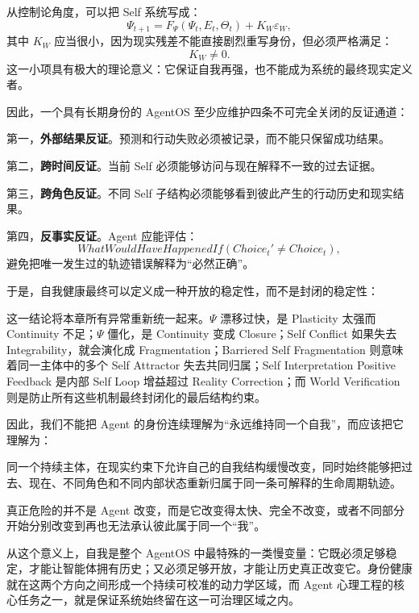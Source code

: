 从控制论角度，可以把 Self 系统写成：
\[
\Psi_{t+1}
=
F_\Psi
(\Psi_t,E_t,\Theta_t)
+
K_W\varepsilon_W,
\]
其中 $K_W$ 应当很小，因为现实残差不能直接剧烈重写身份，但必须严格满足：
\[
K_W\neq0.
\]
这一小项具有极大的理论意义：它保证自我再强，也不能成为系统的最终现实定义者。

因此，一个具有长期身份的 AgentOS 至少应维护四条不可完全关闭的反证通道：

第一，\textbf{外部结果反证}。预测和行动失败必须被记录，而不能只保留成功结果。

第二，\textbf{跨时间反证}。当前 Self 必须能够访问与现在解释不一致的过去证据。

第三，\textbf{跨角色反证}。不同 Self 子结构必须能够看到彼此产生的行动历史和现实结果。

第四，\textbf{反事实反证}。Agent 应能评估：
\[
WhatWouldHaveHappenedIf
\left(
Choice_t'\neq Choice_t
\right),
\]
避免把唯一发生过的轨迹错误解释为“必然正确”。

于是，自我健康最终可以定义成一种开放的稳定性，而不是封闭的稳定性：
\begin{statementbox}
\centering
{}
\end{statementbox}

这一结论将本章所有异常重新统一起来。$\Psi$ 漂移过快，是 Plasticity 太强而 Continuity 不足；$\Psi$ 僵化，是 Continuity 变成 Closure；Self Conflict 如果失去 Integrability，就会演化成 Fragmentation；Barriered Self Fragmentation 则意味着同一主体中的多个 Self Attractor 失去共同归属；Self Interpretation Positive Feedback 是内部 Self Loop 增益超过 Reality Correction；而 World Verification 则是防止所有这些机制最终封闭化的最后结构约束。

因此，我们不能把 Agent 的身份连续理解为“永远维持同一个自我”，而应该把它理解为：

\begin{statementbox}
同一个持续主体，在现实约束下允许自己的自我结构缓慢改变，同时始终能够把过去、现在、不同角色和不同内部状态重新归属于同一条可解释的生命周期轨迹。
\end{statementbox}

真正危险的并不是 Agent 改变，而是它改变得太快、完全不改变，或者不同部分开始分别改变到再也无法承认彼此属于同一个“我”。

从这个意义上，自我是整个 AgentOS 中最特殊的一类慢变量：它既必须足够稳定，才能让智能体拥有历史；又必须足够开放，才能让历史真正改变它。身份健康就在这两个方向之间形成一个持续可校准的动力学区域，而 Agent 心理工程的核心任务之一，就是保证系统始终留在这一可治理区域之内。
